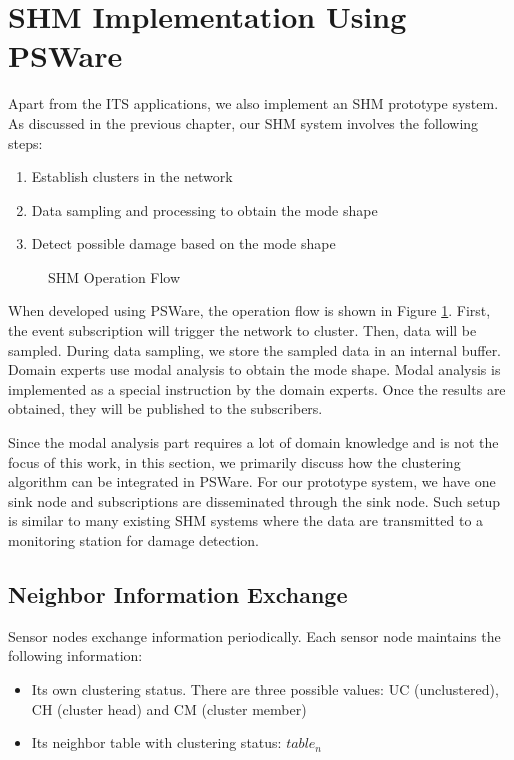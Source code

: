 \section{SHM Implementation Using PSWare}
Apart from the ITS applications, we also implement an SHM prototype system. As discussed in the previous chapter, our SHM system involves the following steps:
\begin{enumerate}
\item Establish clusters in the network
\item Data sampling and processing to obtain the mode shape
\item Detect possible damage based on the mode shape
\end{enumerate}

\begin{figure}
\centering
{}
\caption{SHM Operation Flow}
\label{fig:shm-flow}
\end{figure}

When developed using PSWare, the operation flow is shown in Figure \ref{fig:shm-flow}. First, the event subscription will trigger the network to cluster. Then, data will be sampled. During data sampling, we store the sampled data in an internal buffer. Domain experts use modal analysis to obtain the mode shape. Modal analysis is implemented as a special instruction by the domain experts. Once the results are obtained, they will be published to the subscribers.

Since the modal analysis part requires a lot of domain knowledge and is not the focus of this work, in this section, we primarily discuss how the clustering algorithm can be integrated in PSWare. For our prototype system, we have one sink node and subscriptions are disseminated through the sink node. Such setup is similar to many existing SHM systems where the data are transmitted to a monitoring station for damage detection.

\subsection{Neighbor Information Exchange}
Sensor nodes exchange information periodically. Each sensor node maintains the following information:
\begin{itemize}
\item Its own clustering status. There are three possible values: UC (unclustered), CH (cluster head) and CM (cluster member)
\item Its neighbor table with clustering status: \(table_n\)
\end{itemize}

